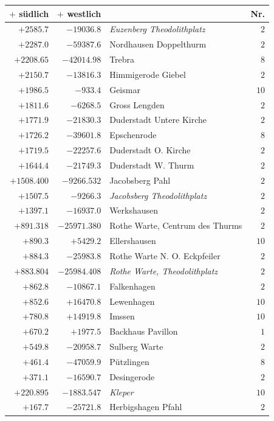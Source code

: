 \begin{center}\begingroup\fontsize{8}{9}\selectfont
\setlength{\tabcolsep}{4pt}
\begin{tabular}{r|r|p{170pt}|r}\hline
\(+\) südlich&\(+\) westlich&&Nr.\\\hline
\(+2585.7\)&\(-19036.8\)&\textit{Euzenberg Theodolithplatz}&\(2\)\\
\(+2287.0\)&\(-59387.6\)&Nordhausen Doppelthurm&\(2\)\\
\(+2208.65\)&\(-42014.98\)&Trebra&\(8\)\\
\(+2150.7\)&\(-13816.3\)&Himmigerode Giebel&\(2\)\\
\(+1986.5\)&\(-933.4\)&Geismar&\(10\)\\
\(+1811.6\)&\(-6268.5\)&Gross Lengden&\(2\)\\
\(+1771.9\)&\(-21830.3\)&Duderstadt Untere Kirche&\(2\)\\
\(+1726.2\)&\(-39601.8\)&Epschenrode&\(8\)\\
\(+1719.5\)&\(-22257.6\)&Duderstadt O. Kirche&\(2\)\\
\(+1644.4\)&\(-21749.3\)&Duderstadt W. Thurm&\(2\)\\
\(+1508.400\)&\(-9266.532\)&Jacobsberg Pahl&\(2\)\\
\(+1507.5\)&\(-9266.3\)&\textit{Jacobsberg Theodolithplatz}&\(2\)\\
\(+1397.1\)&\(-16937.0\)&Werkshausen&\(2\)\\
\(+891.318\)&\(-25971.380\)&Rothe Warte, Centrum des Thurms&\(2\)\\
\(+890.3\)&\(+5429.2\)&Ellershausen&\(10\)\\
\(+884.3\)&\(-25983.8\)&Rothe Warte N. O. Eckpfeiler&\(2\)\\
\(+883.804\)&\(-25984.408\)&\textit{Rothe Warte, Theodolithplatz}&\(2\)\\
\(+862.8\)&\(-10867.1\)&Falkenhagen&\(2\)\\
\(+852.6\)&\(+16470.8\)&Lewenhagen&\(10\)\\
\(+780.8\)&\(+14919.8\)&Imssen&\(10\)\\
\(+670.2\)&\(+1977.5\)&Backhaus Pavillon&\(1\)\\
\(+549.8\)&\(-20958.7\)&Sulberg Warte&\(2\)\\
\(+461.4\)&\(-47059.9\)&Pützlingen&\(8\)\\
\(+371.1\)&\(-16590.7\)&Desingerode&\(2\)\\
\(+220.895\)&\(-1883.547\)&\textit{Kleper}&\(10\)\\
\(+167.7\)&\(-25721.8\)&Herbigshagen Pfahl&\(2\)\\

\end{tabular}
\end{center}
